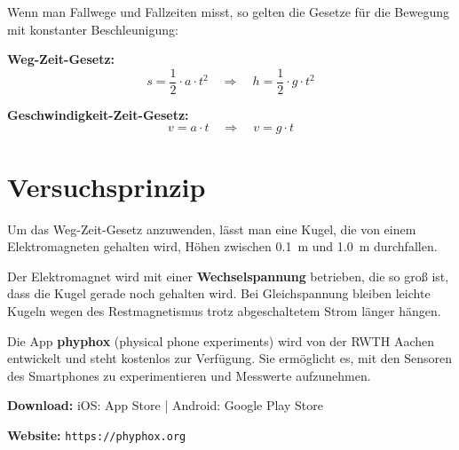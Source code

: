 \documentclass[11pt,a4paper]{scrartcl}
\begin{document}
	Wenn man Fallwege und Fallzeiten misst, so gelten die Gesetze für die Bewegung mit konstanter Beschleunigung:
	
	\begin{formelbox}[title={\faIcon{square-root-alt} Bewegungsgleichungen des freien Falls}]
		\textbf{Weg-Zeit-Gesetz:}
		\begin{equation*}
			s = \frac{1}{2} \cdot a \cdot t^2 \quad \Rightarrow \quad h = \frac{1}{2} \cdot g \cdot t^2
		\end{equation*}
		
		\textbf{Geschwindigkeit-Zeit-Gesetz:}
		\begin{equation*}
			v = a \cdot t \quad \Rightarrow \quad v = g \cdot t
		\end{equation*}
	\end{formelbox}
	
	\section*{Versuchsprinzip}
	
	Um das Weg-Zeit-Gesetz anzuwenden, lässt man eine Kugel, die von einem Elektromagneten gehalten wird, Höhen zwischen \SI{0,1}{\metre} und \SI{1,0}{\metre} durchfallen. 
	
	\begin{hilfebox}
		Der Elektromagnet wird mit einer \textbf{Wechselspannung} betrieben, die so groß ist, dass die Kugel gerade noch gehalten wird. Bei Gleichspannung bleiben leichte Kugeln wegen des Restmagnetismus trotz abgeschaltetem Strom länger hängen.
	\end{hilfebox}
	
	\begin{infobox}[title={\faIcon{info-circle} Die App phyphox}]
		Die App \textbf{phyphox} (physical phone experiments) wird von der RWTH Aachen entwickelt und steht kostenlos zur Verfügung. Sie ermöglicht es, mit den Sensoren des Smartphones zu experimentieren und Messwerte aufzunehmen.
		
		\vspace{0.2cm}
		\textbf{Download:} \quad iOS: App Store \quad | \quad Android: Google Play Store
		
		\vspace{0.2cm}
		\textbf{Website:} \texttt{https://phyphox.org}
	\end{infobox}
	
\end{document}
